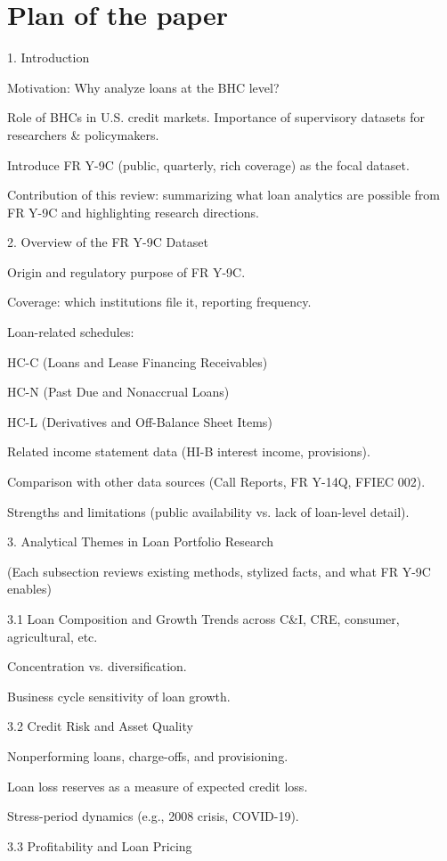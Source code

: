 \documentclass[conference]{IEEEtran}
\begin{document}
\section{Plan of the paper}
1. Introduction

Motivation: Why analyze loans at the BHC level?

Role of BHCs in U.S. credit markets.
Importance of supervisory datasets for researchers \& policymakers.

Introduce FR Y-9C (public, quarterly, rich coverage) as the focal dataset.

Contribution of this review: summarizing what loan analytics are possible from FR Y-9C and highlighting research directions.

2. Overview of the FR Y-9C Dataset

Origin and regulatory purpose of FR Y-9C.

Coverage: which institutions file it, reporting frequency.

Loan-related schedules:

HC-C (Loans and Lease Financing Receivables)

HC-N (Past Due and Nonaccrual Loans)

HC-L (Derivatives and Off-Balance Sheet Items)

Related income statement data (HI-B interest income, provisions).

Comparison with other data sources (Call Reports, FR Y-14Q, FFIEC 002).

Strengths and limitations (public availability vs. lack of loan-level detail).

3. Analytical Themes in Loan Portfolio Research

(Each subsection reviews existing methods, stylized facts, and what FR Y-9C enables)

3.1 Loan Composition and Growth
Trends across C\&I, CRE, consumer, agricultural, etc.

Concentration vs. diversification.

Business cycle sensitivity of loan growth.

3.2 Credit Risk and Asset Quality

Nonperforming loans, charge-offs, and provisioning.

Loan loss reserves as a measure of expected credit loss.

Stress-period dynamics (e.g., 2008 crisis, COVID-19).

3.3 Profitability and Loan Pricing
\end{document}
